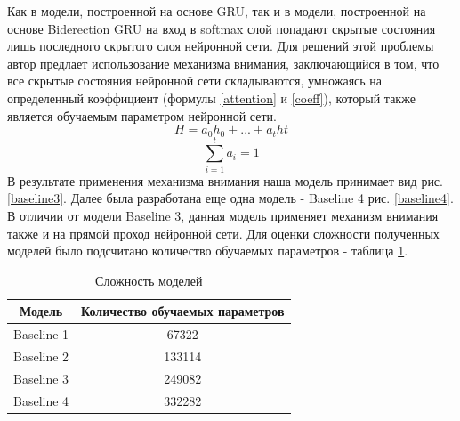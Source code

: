     Как в модели, построенной на основе GRU, так и в модели, построенной на основе Biderection GRU на вход в softmax слой попадают скрытые состояния лишь последного скрытого слоя нейронной сети. Для решений этой проблемы автор предлает использование механизма внимания, заключающийся в том, что все скрытые состояния нейронной сети складываются, умножаясь на определенный коэффициент (формулы \ref{attention} и \ref{coeff}), который также является обучаемым параметром нейронной сети.
    \begin{equation}\label{attention}
    H = a_{0}h_{0}+...+a_{t}h{t}
    \end{equation}
    \begin{equation}\label{coeff}
    \sum_{i=1}^{t} a_{i}=1
    \end{equation}
    В результате применения механизма внимания наша модель принимает вид рис. \ref{baseline3}.
    Далее была разработана еще одна модель - Baseline 4 рис. \ref{baseline4}. В отличии от модели Baseline 3, данная модель применяет механизм внимания также и на прямой проход нейронной сети.
    Для оценки сложности полученных моделей было подсчитано количество обучаемых параметров - таблица \ref{hard}.
    \begin{table}[ht]
    \centering
    \caption{Сложность моделей}\label{hard}
    \begin{tabular}{@{}cc@{}}
    \toprule
    Модель         & Количество обучаемых параметров \\ \midrule
    Baseline 1 & 67322     \\
    Baseline 2 & 133114      \\
    Baseline 3 & 249082    \\
    Baseline 4 & 332282   \\ \bottomrule
    \end{tabular}
    \end{table}

